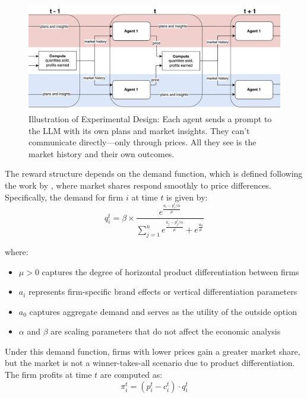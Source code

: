 \begin{figure}[H]
    \centering
    \includegraphics[width=1\linewidth]{latex//imgs/illustration_experimental_design.png}
    \caption{Illustration of Experimental Design: Each agent sends a prompt to the LLM with its own plans and market insights. They can't communicate directly—only through prices. All they see is the market history and their own outcomes.}
    \label{fig:experimental_design}
\end{figure}


The reward structure depends on the demand function, which is defined following the work by \textcite{calvano_artificial_2020}, where market shares respond smoothly to price differences. Specifically, the demand for firm $i$ at time $t$ is given by:
\begin{equation}
    q_i^t = \beta \times \frac{e^{\frac{a_i - p_i^t/\alpha}{\mu}}}{\sum_{j=1}^{n} e^{\frac{a_j - p_j^t/\alpha}{\mu}} + e^{\frac{a_0}{\mu}}}
\end{equation}

where:
\begin{itemize}
    \item $\mu > 0$ captures the degree of horizontal product differentiation between firms
    \item $a_i$ represents firm-specific brand effects or vertical differentiation parameters
    \item $a_0$ captures aggregate demand and serves as the utility of the outside option
    \item $\alpha$ and $\beta$ are scaling parameters that do not affect the economic analysis
\end{itemize}
Under this demand function, firms with lower prices gain a greater market share, but the market is not a winner-takes-all scenario due to product differentiation. The firm profits at time \( t \) are computed as: 
\begin{equation}
    \pi_i^t = (p_i^t - c_i^t) \cdot q_i^t
\end{equation}

